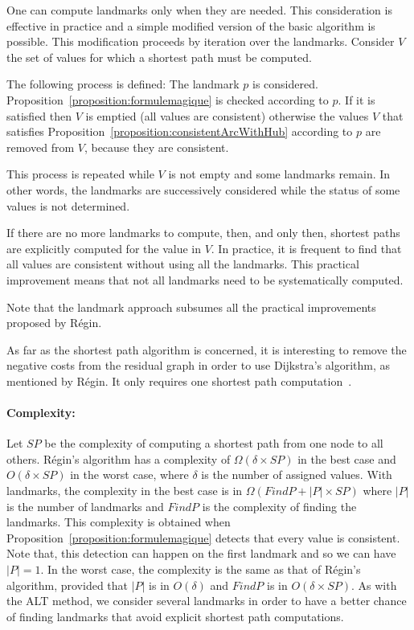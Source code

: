 One can compute landmarks only when they are needed. This consideration is effective in practice and a simple modified version of the basic algorithm is possible. This modification proceeds by iteration over the landmarks. Consider $V$ the set of values for which a shortest path must be computed. 

The following process is defined:
The landmark $p$ is considered. 
Proposition~\ref{proposition:formulemagique} is checked according to $p$. If it is satisfied then $V$ is emptied (all values are consistent) otherwise the values $V$ that satisfies Proposition~\ref{proposition:consistentArcWithHub} according to $p$ are removed from $V$, because they are consistent.

This process is repeated while $V$ is not empty and some landmarks remain. 
In other words, the landmarks are successively considered while the status of some values is not determined.

If there are no more landmarks to compute, then, and only then, shortest paths are explicitly computed for the value in $V$. 
In practice, it is frequent to find that all values are consistent without using all the landmarks.
This practical improvement means that not all landmarks need to be systematically computed.

Note that the landmark approach subsumes all the practical improvements proposed by Régin.

As far as the shortest path algorithm is concerned, it is interesting to remove the negative costs from the residual graph in order to use Dijkstra's algorithm, as mentioned by Régin. It only requires one shortest path computation~\cite{Regin:CostbasedArcConsistencyforGlobalCardinalityConstraints}. 

\paragraph*{Complexity:}

Let $SP$ be the complexity of computing a shortest path from one node to all others.
Régin's algorithm has a complexity of $\Omega(\delta \times SP)$ in the best case and $O(\delta \times SP)$ in the worst case, where $\delta$ is the number of assigned values.
With landmarks, the complexity in the best case is in $\Omega(FindP + |P| \times SP)$ where $|P|$ is the number of landmarks and $FindP$ is the complexity of finding the landmarks. This complexity is obtained when Proposition~\ref{proposition:formulemagique} detects that every value is consistent. Note that, this detection can happen on the first landmark and so we can have $|P|=1$. In the worst case, the complexity is the same as that of Régin's algorithm, provided that $|P|$ is in $O(\delta)$ and $FindP$ is in $O(\delta \times SP)$.
As with the ALT method, we consider several landmarks in order to have a better chance of finding landmarks that avoid explicit shortest path computations.

